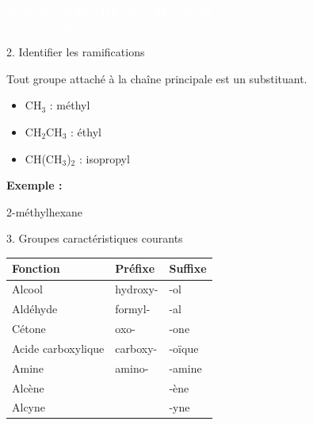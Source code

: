 \documentclass[a4paper,11pt]{article}
\begin{document}

\begin{center}
\begin{tcolorbox}[
colback=mainblue,
colframe=mainblue,
width=\textwidth,
arc=3mm,
boxrule=0pt
]
\centering
{\Huge \textcolor{white}{\textbf{NOMENCLATURE DES ALCANES}}}\\[0.3cm]
{\Large \textcolor{white}{Règles simplifiées de nomenclature organique}}
\end{tcolorbox}
\end{center}

\vspace{0.4cm}
\begin{sectionbox}[greenbox]{2. Identifier les ramifications}

Tout groupe attaché à la chaîne principale est un substituant.

\begin{itemize}[leftmargin=*]
    \item CH$_3$ : méthyl
    \item CH$_2$CH$_3$ : éthyl
    \item CH(CH$_3$)$_2$ : isopropyl
\end{itemize}

\vspace{0.3cm}

\textbf{Exemple :}

2-méthylhexane

\end{sectionbox}


\begin{sectionbox}[purplebox]{3. Groupes caractéristiques courants}

\small

\begin{tabularx}{\linewidth}{|X|X|X|}
\hline
\textbf{Fonction} & \textbf{Préfixe} & \textbf{Suffixe} \\
\hline
Alcool & hydroxy- & -ol \\
\hline
Aldéhyde & formyl- & -al \\
\hline
Cétone & oxo- & -one \\
\hline
Acide carboxylique & carboxy- & -oïque \\
\hline
Amine & amino- & -amine \\
\hline
Alcène & & -ène \\
\hline
Alcyne & & -yne \\
\hline
\end{tabularx}

\end{sectionbox}
\end{document}
